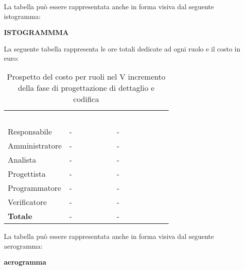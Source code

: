 La tabella può essere rappresentata anche in forma visiva dal seguente istogramma:

\textbf{ISTOGRAMMMA}


La seguente tabella rappresenta le ore totali dedicate ad ogni ruolo e il costo in euro:

\begin{table}[!htbp]
\begin{center}
\renewcommand{\arraystretch}{1.5}
\begin{tabular}{ m{}<{\centering}  m{}<{\centering} m{}<{\centering}}
	\rowcolor{darkblue}
	\textcolor{white}{\textbf{Ruolo}}&\textcolor{white}{\textbf{Totale ore}}&\textcolor{white}{\textbf{Costo totale}}\\ 

	Responsabile  & - & - \\	

	\rowcolor{gray!10} Amministratore & - & - \\
	
	Analista & - & - \\
	
	\rowcolor{gray!10} Progettista & - & - \\
	
	Programmatore & - & - \\
	
	\rowcolor{gray!10} Verificatore & - & - \\
	
	\textbf{Totale} & - & - \\
	
\end{tabular}
\caption{Prospetto del costo per ruoli nel V incremento della fase di progettazione di dettaglio e codifica}
\end{center}
\end{table}

La tabella può essere rappresentata anche in forma visiva dal seguente aerogramma:

\textbf{aerogramma}


